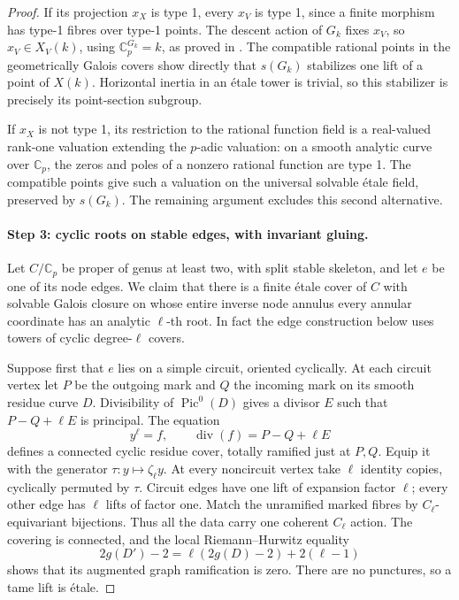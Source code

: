 \begin{proof}
If its projection $x_X$ is type 1, every $x_V$ is type 1, since a
finite morphism has type-1 fibres over type-1 points.  The descent
action of $G_k$ fixes $x_V$, so $x_V\in X_V(k)$, using
$\mathbb C_p^{G_k}=k$, as proved in \cite[Theorem 1, p.~176]{DE_Tate1967}.  The compatible rational points in the
geometrically Galois covers show directly that $s(G_k)$ stabilizes
one lift of a point of $X(k)$.  Horizontal inertia in an \'etale
tower is trivial, so this stabilizer is precisely its point-section
subgroup.

If $x_X$ is not type 1, its restriction to the rational function
field is a real-valued rank-one valuation extending the $p$-adic
valuation: on a smooth analytic curve over $\mathbb C_p$, the zeros
and poles of a nonzero rational function are type 1.  The compatible
points give such a valuation on the universal solvable \'etale
field, preserved by $s(G_k)$.  The remaining argument excludes this
second alternative.

\paragraph{Step 3: cyclic roots on stable edges, with invariant gluing.}

Let $C/\mathbb C_p$ be proper of genus at least two, with split stable
skeleton, and let $e$ be one of its node edges.  We claim that there
is a finite \'etale cover of $C$ with solvable Galois closure on whose
entire inverse node annulus every annular coordinate has an analytic
$\ell$-th root.  In fact the edge construction below uses towers
of cyclic degree-$\ell$ covers.

Suppose first that $e$ lies on a simple circuit, oriented cyclically.
At each circuit vertex let $P$ be the outgoing mark and $Q$ the
incoming mark on its smooth residue curve $D$.  Divisibility of
$\operatorname{Pic}^0(D)$ gives a divisor $E$ such that
$P-Q+\ell E$ is principal.  The equation
\[
                          y^\ell=f,
       \qquad \operatorname{div}(f)=P-Q+\ell E
\]
defines a connected cyclic residue cover, totally ramified just at
$P,Q$.  Equip it with the generator $\tau:y\mapsto\zeta_\ell y$.
At every noncircuit vertex take $\ell$ identity copies, cyclically
permuted by $\tau$.  Circuit edges have one lift of expansion factor
$\ell$; every other edge has $\ell$ lifts of factor one.  Match the
unramified marked fibres by $C_\ell$-equivariant bijections.  Thus all
the data carry one coherent $C_\ell$ action.  The covering is
connected, and the local Riemann--Hurwitz equality
\[
  2g(D')-2=\ell(2g(D)-2)+2(\ell-1)
\]
shows that its augmented graph ramification is zero.  There are no
punctures, so a tame lift is \'etale.


\end{proof}
